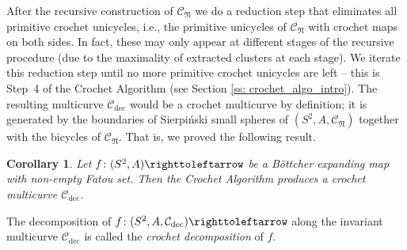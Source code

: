 \documentclass{amsart}
\theoremstyle{plain}
\newtheorem{corollary}[theorem]{Corollary}
\theoremstyle{definition}
\newtheorem{definition}[theorem]{Definition}
\theoremstyle{remark}
\newcommand{\CC}{{\mathcal C}}
\newcommand{\NL}{{\mathfrak N}}
\newcommand\selfmap{\righttoleftarrow}
\newcommand{\cro}{{\operatorname{dec}}}
\begin{document}
After the recursive construction of $\CC_\NL$ we do a reduction step that eliminates all primitive crochet unicycles, i.e., the primitive unicycles of $\CC_\NL$ with crochet maps on both sides. In fact, these may only appear at different stages of the recursive procedure (due to the maximality of extracted clusters at each stage). We iterate this reduction step until no more primitive crochet unicycles are left -- this is Step~4 of the Crochet Algorithm (see Section \ref{ss: crochet_algo_intro}).  The resulting multicurve $\CC_\cro$ would be a crochet multicurve by definition; it is generated by the boundaries of Sierpi\'{n}ski small spheres of $(S^2,A,\CC_\NL)$ together with the bicycles of $\CC_\NL$.  That is, we proved the following result. 

\begin{corollary}\label{cor: cro multicurve exists}
Let $f\colon (S^2,A)\selfmap$ be a B\"ottcher expanding map with non-empty Fatou set. Then the Crochet Algorithm produces a crochet multicurve $\CC_\cro$. 
\end{corollary}

The decomposition of $f\colon (S^2,A,\CC_\cro)\selfmap$ along the invariant multicurve $\CC_\cro$ is called the \emph{crochet decomposition} of $f$.  

%
%
\end{document}
